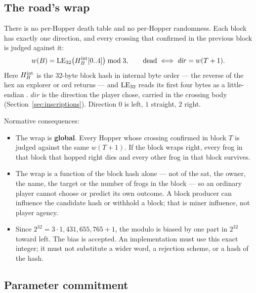 \subsection{The road's wrap}

There is no per-Hopper death table and no per-Hopper randomness. Each block
has exactly one direction, and every crossing that confirmed in the previous
block is judged against it:
\begin{equation}\label{eq:wrap}
w(B)=\operatorname{LE}_{32}\!\left(H_B^{\rm int}[0..4]\right)\bmod 3,
\qquad
\text{dead}\iff \mathit{dir}=w(T+1).
\end{equation}
Here $H_B^{\rm int}$ is the 32-byte block hash in internal byte order --- the
reverse of the hex an explorer or ord returns --- and $\operatorname{LE}_{32}$ reads its
first four bytes as a little-endian . $\mathit{dir}$ is the
direction the player chose, carried in the crossing body
(Section~\ref{sec:inscriptions}). Direction $0$ is left, $1$ straight, $2$
right.

Normative consequences:

\begin{itemize}[leftmargin=1.4em,itemsep=0.3em]
  \item The wrap is \textbf{global}. Every Hopper whose crossing confirmed in
        block $T$ is judged against the same $w(T+1)$. If the block wraps
        right, every frog in that block that hopped right dies and every
        other frog in that block survives.
  \item The wrap is a function of the block hash alone --- not of the sat, the
        owner, the name, the target or the number of frogs in the block ---
        so an ordinary player cannot choose or predict its own outcome. A
        block producer can influence the candidate hash or withhold a block;
        that is miner influence, not player agency.
  \item Since $2^{32}=3\cdot1{,}431{,}655{,}765+1$, the modulo is biased by
        one part in $2^{32}$ toward left. The bias is accepted. An
        implementation must use this exact integer; it must not substitute a
        wider word, a rejection scheme, or a hash of the hash.
\end{itemize}

\subsection{Parameter commitment}

